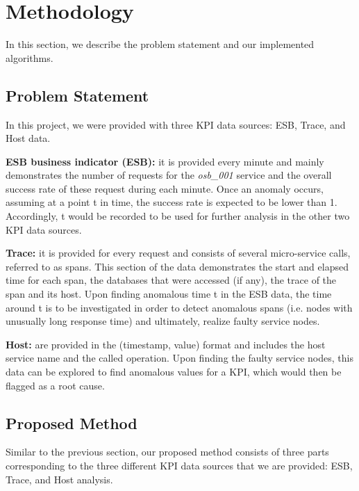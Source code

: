 \documentclass[12pt]{article}
\begin{document}
\section{Methodology} 
In this section, we describe the problem statement and our implemented algorithms.

\vspace{-0.2cm}
\subsection{Problem Statement}
In this project, we were provided with three KPI data sources: ESB, Trace, and Host data.

\smallskip\smallskip
\noindent \textbf{ESB business indicator (ESB): }it is provided every minute and mainly demonstrates the number of requests for the \textit{osb\_001} service and the overall success rate of these request during each minute. Once an anomaly occurs, assuming at a point t in time, the success rate is expected to be lower than 1. Accordingly, t would be recorded to be used for further analysis in the other two KPI data sources.

\smallskip
\noindent \textbf{Trace: }it is provided for every request and consists of several micro-service calls, referred to as spans. This section of the data demonstrates the start and elapsed time for each span, the databases that were accessed (if any), the trace of the span and its host. Upon finding anomalous time t in the ESB data, the time around t is to be investigated in order to detect anomalous spans (i.e. nodes with unusually long response time) and ultimately, realize faulty service nodes. 

\smallskip
\noindent \textbf{Host: }are provided in the (timestamp, value) format and includes the host service name and the called operation. Upon finding the faulty service nodes, this data can be explored to find anomalous values for a KPI, which would then be flagged as a root cause.

\vspace{-0.2cm}
\subsection{Proposed Method}
Similar to the previous section, our proposed method consists of three parts corresponding to the three different KPI data sources that we are provided: ESB, Trace, and Host analysis.
\end{document}
